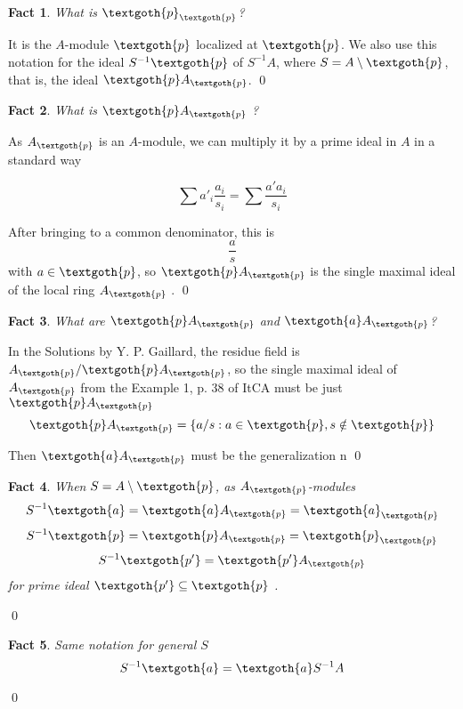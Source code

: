 \documentclass{article}
\newtheorem{theorem}{Fact}[section]
\begin{document}
\bigskip
\begin{theorem}
What is $\textgoth{p}_\textgoth{p}$?
\end{theorem}

\noindent
It is the $A$-module $\textgoth{p}$ localized at $\textgoth{p}$. We also use this notation for the ideal $S^{-1}\textgoth{p}$ of $S^{-1}A$, where $S = A \setminus \textgoth{p}$, that is, the ideal $\textgoth{p}A_\textgoth{p}$.
\qed

\bigskip
\begin{theorem}
What is $ \textgoth{p} A_\textgoth{p}$ ?
\end{theorem}

As $A_\textgoth{p}$ is an $A$-module, we can multiply it by a prime ideal in $A$ in a standard way

\[
 \sum a'_i \frac{a_i}{s_i} = \sum \frac{a' a_i}{s_i}
\]

\noindent
After bringing to a common denominator, this is
\[
 \frac{a}{s}
\]
\noindent
with $a \in \textgoth{p}$, so $ \textgoth{p} A_\textgoth{p}$ is the single maximal ideal of the local ring $A_\textgoth{p}$ .
\qed

\bigskip
\begin{theorem}
What are $\textgoth{p}A_\textgoth{p}$ and $\textgoth{a}A_\textgoth{p}$?
\end{theorem}

\noindent
In the Solutions by Y. P. Gaillard, the residue field is $A_\textgoth{p} / \textgoth{p}A_\textgoth{p}$, so the single maximal ideal of $A_\textgoth{p}$ from the Example 1, p. 38 of ItCA must be just $\textgoth{p}A_\textgoth{p}$
\[
  \textgoth{p}A_\textgoth{p} = \{a/s: a \in \textgoth{p}, s \notin \textgoth{p}\}
\]

\noindent
Then $\textgoth{a}A_\textgoth{p}$ must be the generalization
n
\qed

\bigskip
\begin{theorem}
When $S=A \setminus \textgoth{p}$, as $A_\textgoth{p}$-modules
\[
S^{-1}\textgoth{a} = \textgoth{a}A_\textgoth{p} = \textgoth{a}_\textgoth{p} 
\]
\[
S^{-1}\textgoth{p} = \textgoth{p}A_\textgoth{p} = \textgoth{p}_\textgoth{p} 
\]
\[
S^{-1}\textgoth{p'} = \textgoth{p'}A_\textgoth{p} 
\]
for prime ideal $\textgoth{p'} \subseteq \textgoth{p}$ .
\end{theorem}
\qed

\bigskip
\begin{theorem}
Same notation for general $S$
\[
S^{-1}\textgoth{a} = \textgoth{a}S^{-1}A
\]
\end{theorem}
\qed
\end{document}
